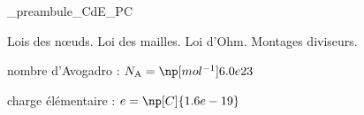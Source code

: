 



\ifdefined\mainIsLoaded\else
\RequirePackage{import}
{_preambule_CdE_PC}

\fi







\debutFicheEntrainement                                                                      %


\begin{prerequis}
	Lois des n\oe uds. Loi des mailles. Loi d'Ohm. Montages diviseurs. %

\constantesUtiles
	\begin{listeConstantes}
		\item nombre d'Avogadro : $N_\text{A}=\np[mol^{-1}]{6.0e23}$
		\item charge élémentaire : $e=\np[C]{1.6e-19}$
	\end{listeConstantes}
\end{prerequis}









